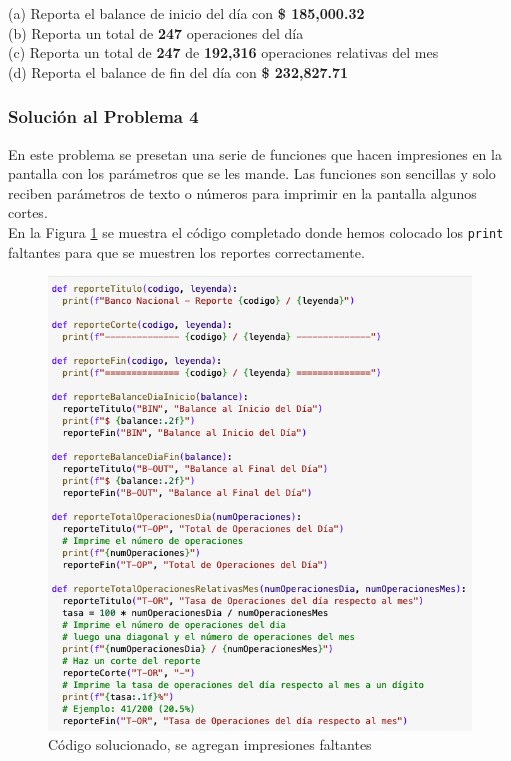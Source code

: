 \documentclass{article}
\begin{document}
\noindent
(a) Reporta el balance de inicio del día con \textbf{\$ 185,000.32}
\\[6pt]
(b) Reporta un total de \textbf{247} operaciones del día
\\[6pt]
(c) Reporta un total de \textbf{247} de \textbf{192,316} operaciones relativas del mes
\\[6pt]
(d) Reporta el balance de fin del día con \textbf{\$ 232,827.71}
\\[6pt]

\clearpage

\subsubsection*{Solución al Problema 4}

En este problema se presetan una serie de funciones que hacen impresiones en la pantalla con los parámetros que se les mande. Las funciones son sencillas y solo reciben parámetros de texto o números para imprimir en la pantalla algunos cortes.
\\[12pt]
En la Figura \ref{fig:s104-1} se muestra el código completado donde hemos colocado los \texttt{print} faltantes para que se muestren los reportes correctamente.
\begin{figure}[!ht]
    \centering
    \begin{minipage}{\textwidth}
        \centering
        \includegraphics[width=\textwidth]{figures/s104-1.png}
    \end{minipage}
    \captionsetup{width=0.9\textwidth}
    \caption{Código solucionado, se agregan impresiones faltantes}
    \label{fig:s104-1}
\end{figure}
\end{document}
